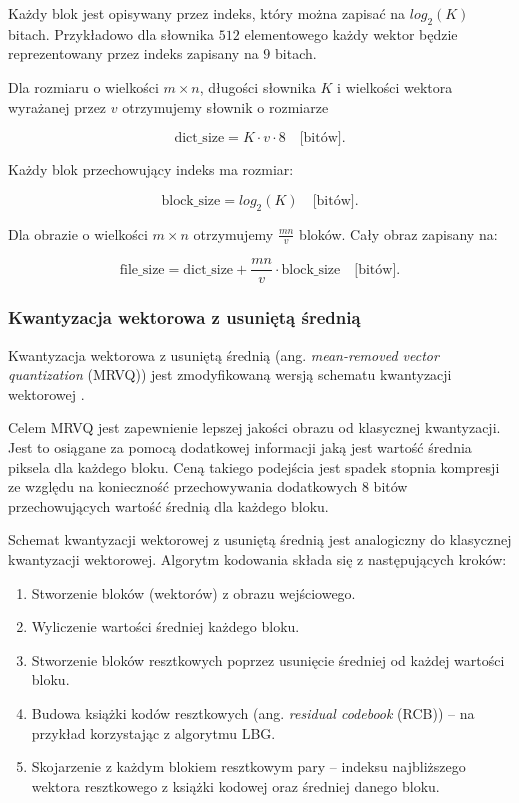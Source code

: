\documentclass{article}
\begin{document}
Każdy blok jest opisywany przez indeks, który można zapisać na $log_2(K)$ bitach. Przykładowo dla słownika $512$ elementowego każdy wektor będzie reprezentowany przez indeks zapisany na $9$ bitach.


Dla rozmiaru o wielkości $m \times n$, długości słownika $K$ i wielkości wektora wyrażanej przez $v$ otrzymujemy słownik o rozmiarze

\begin{equation}
  \textrm{dict\_size} = K \cdot v \cdot 8 \quad \textrm{[bitów]}.
  \label{eq:lgb_dict_size}
\end{equation}

Każdy blok przechowujący indeks ma rozmiar:

\begin{equation}
  \textrm{block\_size} = log_2(K)  \quad  \textrm{[bitów]}.
  \label{eq:lgb_indeks_size}
\end{equation}

Dla obrazie o wielkości $m \times n$ otrzymujemy $\frac{mn}{v}$ bloków. Cały obraz zapisany na: 

\begin{equation}
  \textrm{file\_size} = \textrm{dict\_size} + \frac{mn}{v} \cdot \textrm{block\_size}  \quad  \textrm{[bitów]}.
  \label{eq:lgb_image_size}
\end{equation}

\subsubsection{Kwantyzacja wektorowa z usuniętą średnią}

Kwantyzacja wektorowa z usuniętą średnią (ang. \emph{mean-removed vector quantization} (MRVQ)) jest zmodyfikowaną wersją schematu kwantyzacji wektorowej \cite{meanremovedVQ}.

Celem MRVQ jest zapewnienie lepszej jakości obrazu od klasycznej kwantyzacji. Jest to osiągane za pomocą dodatkowej informacji jaką jest wartość średnia piksela dla każdego bloku. Ceną takiego podejścia jest spadek stopnia kompresji ze względu na konieczność przechowywania dodatkowych 8 bitów przechowujących wartość średnią dla każdego bloku.

Schemat kwantyzacji wektorowej z usuniętą średnią jest analogiczny do klasycznej kwantyzacji wektorowej. Algorytm kodowania składa się z następujących kroków:

\begin{enumerate}
  \item Stworzenie bloków (wektorów) z obrazu wejściowego.
  \item Wyliczenie wartości średniej każdego bloku.
  \item Stworzenie bloków resztkowych poprzez usunięcie średniej od każdej wartości bloku.
  \item Budowa książki kodów resztkowych (ang. \emph{residual codebook} (RCB)) -- na przykład korzystając z algorytmu LBG.
  \item Skojarzenie z każdym blokiem resztkowym pary -- indeksu najbliższego wektora resztkowego z książki kodowej oraz średniej danego bloku.
\end{enumerate}
\end{document}
